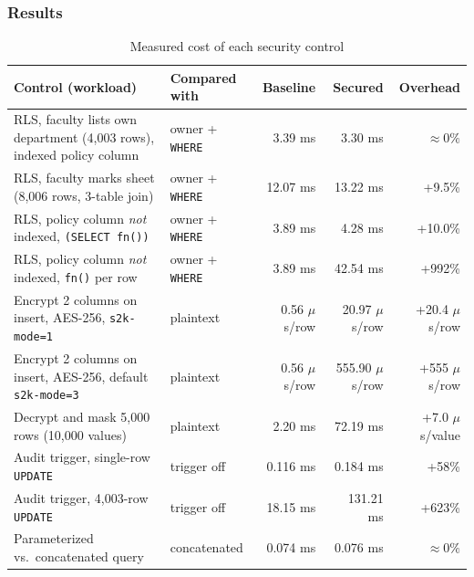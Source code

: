 \documentclass[11pt,a4paper]{report}
\begin{document}
\subsubsection{Results}
\begin{table}[H]
    \centering
    \caption{Measured cost of each security control}
    \label{tab:perf}
    \footnotesize
    \begin{tabularx}{\textwidth}{|Y|l|r|r|r|}
        \hline
        \textbf{Control (workload)} & \textbf{Compared with} & \textbf{Baseline} & \textbf{Secured} & \textbf{Overhead} \\ \hline
        RLS, faculty lists own department (4,003 rows), indexed policy column & owner + \texttt{WHERE} & 3.39 ms & 3.30 ms & $\approx 0\%$ \\ \hline
        RLS, faculty marks sheet (8,006 rows, 3-table join) & owner + \texttt{WHERE} & 12.07 ms & 13.22 ms & +9.5\% \\ \hline
        RLS, policy column \emph{not} indexed, \texttt{(SELECT fn())} & owner + \texttt{WHERE} & 3.89 ms & 4.28 ms & +10.0\% \\ \hline
        RLS, policy column \emph{not} indexed, \texttt{fn()} per row & owner + \texttt{WHERE} & 3.89 ms & 42.54 ms & +992\% \\ \hline
        Encrypt 2 columns on insert, AES-256, \texttt{s2k-mode=1} & plaintext & 0.56 $\mu$s/row & 20.97 $\mu$s/row & +20.4 $\mu$s/row \\ \hline
        Encrypt 2 columns on insert, AES-256, default \texttt{s2k-mode=3} & plaintext & 0.56 $\mu$s/row & 555.90 $\mu$s/row & +555 $\mu$s/row \\ \hline
        Decrypt and mask 5,000 rows (10,000 values) & plaintext & 2.20 ms & 72.19 ms & +7.0 $\mu$s/value \\ \hline
        Audit trigger, single-row \texttt{UPDATE} & trigger off & 0.116 ms & 0.184 ms & +58\% \\ \hline
        Audit trigger, 4,003-row \texttt{UPDATE} & trigger off & 18.15 ms & 131.21 ms & +623\% \\ \hline
        Parameterized vs.\ concatenated query & concatenated & 0.074 ms & 0.076 ms & $\approx 0\%$ \\ \hline
    \end{tabularx}
\end{table}
\end{document}

